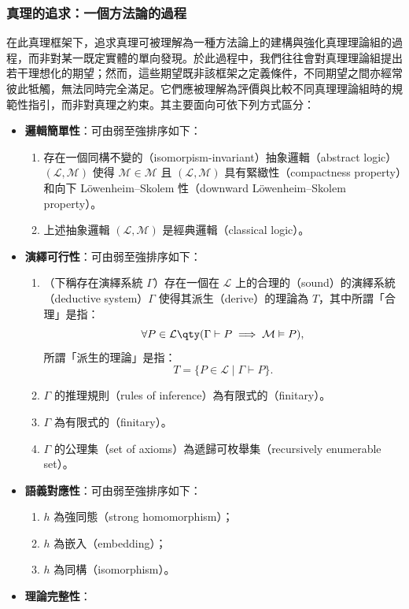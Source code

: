 \documentclass[a4paper,12pt]{article}
\begin{document}
\subsubsection{真理的追求：一個方法論的過程}
在此真理框架下，追求真理可被理解為一種方法論上的建構與強化真理理論組的過程，而非對某一既定實體的單向發現。於此過程中，我們往往會對真理理論組提出若干理想化的期望；然而，這些期望既非該框架之定義條件，不同期望之間亦經常彼此牴觸，無法同時完全滿足。它們應被理解為評價與比較不同真理理論組時的規範性指引，而非對真理之約束。其主要面向可依下列方式區分：
\begin{itemize}
\item \textbf{邏輯簡單性}：可由弱至強排序如下：
\begin{enumerate}
\item 存在一個同構不變的（isomorpism-invariant）抽象邏輯（abstract logic）$(\mathcal{L},\mathscr{M})$ 使得 $\mathcal{M}\in\mathscr{M}$ 且 $(\mathcal{L},\mathscr{M})$ 具有緊緻性（compactness property）和向下 Löwenheim–Skolem 性（downward Löwenheim–Skolem property）。
\item 上述抽象邏輯 $(\mathcal{L},\mathscr{M})$ 是經典邏輯（classical logic）。
\end{enumerate}
\item \textbf{演繹可行性}：可由弱至強排序如下：
\begin{enumerate}
\item （下稱存在演繹系統 $\Gamma$）存在一個在 $\mathcal{L}$ 上的合理的（sound）的演繹系統（deductive system）$\Gamma$ 使得其派生（derive）的理論為 $T$，其中所謂「合理」是指：
\[\forall P\in\mathcal{L}\qty(\Gamma\vdash P\implies\mathcal{M}\vDash P),\]
所謂「派生的理論」是指：
\[T=\{P\in\mathcal{L}\mid\Gamma\vdash P\}.\]
\item $\Gamma$ 的推理規則（rules of inference）為有限式的（finitary）。
\item $\Gamma$ 為有限式的（finitary）。
\item $\Gamma$ 的公理集（set of axioms）為遞歸可枚舉集（recursively enumerable set）。
\end{enumerate}
\item \textbf{語義對應性}：可由弱至強排序如下：
\begin{enumerate}
\item $h$ 為強同態（strong homomorphism）；
\item $h$ 為嵌入（embedding）；
\item $h$ 為同構（isomorphism）。
\end{enumerate}
\item \textbf{理論完整性}：

\end{itemize}
\end{document}
